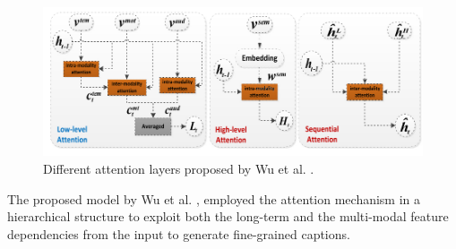 \documentclass[preprint, 12pt]{elsarticle}
\begin{document}
	
%		
		\begin{figure}[H]
			\centering
			\includegraphics[scale=0.45]{Imgs/attentions.png}
			\caption{Different attention layers proposed by Wu et al. \cite{wu2018hierarchical}.}
			\label{fig:attnss}
		\end{figure}
	
	The proposed model by Wu et al. \cite{wu2018hierarchical}, employed the attention mechanism in a hierarchical structure to exploit both the long-term and the multi-modal feature dependencies from the input to generate fine-grained captions.
		
\end{document}
